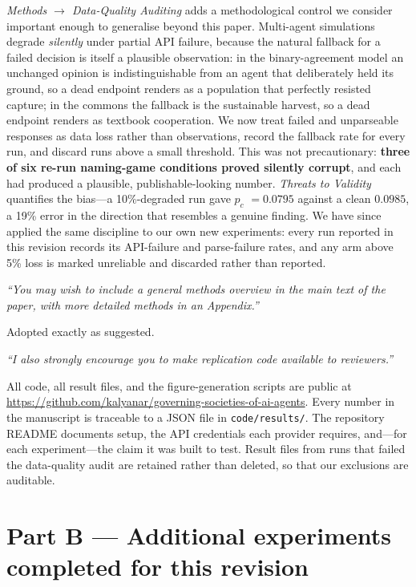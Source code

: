 \documentclass[11pt,a4paper]{article}
\newenvironment{editorquote}
  {\par\medskip\noindent\begin{list}{}{%
     \setlength{\leftmargin}{2em}\setlength{\rightmargin}{1em}}\item[]%
     \color{black!72}\itshape}
  {\end{list}\medskip}
\newcommand{\pc}{$p_c$}
\begin{document}
\emph{Methods $\to$ Data-Quality Auditing} adds a methodological control we consider
important enough to generalise beyond this paper. Multi-agent simulations degrade
\emph{silently} under partial API failure, because the natural fallback for a failed
decision is itself a plausible observation: in the binary-agreement model an
unchanged opinion is indistinguishable from an agent that deliberately held its
ground, so a dead endpoint renders as a population that perfectly resisted capture;
in the commons the fallback is the sustainable harvest, so a dead endpoint renders
as textbook cooperation. We now treat failed and unparseable responses as data loss
rather than observations, record the fallback rate for every run, and discard runs
above a small threshold. This was not precautionary: \textbf{three of six re-run
naming-game conditions proved silently corrupt}, and each had produced a plausible,
publishable-looking number. \emph{Threats to Validity} quantifies the bias---a
10\%-degraded run gave \pc{} $=0.0795$ against a clean $0.0985$, a 19\% error in the
direction that resembles a genuine finding. We have since applied the same
discipline to our own new experiments: every run reported in this revision records
its API-failure and parse-failure rates, and any arm above 5\% loss is marked
unreliable and discarded rather than reported.

\begin{editorquote}
``You may wish to include a general methods overview in the main text of the paper,
with more detailed methods in an Appendix.''
\end{editorquote}

Adopted exactly as suggested.

\begin{editorquote}
``I also strongly encourage you to make replication code available to reviewers.''
\end{editorquote}

All code, all result files, and the figure-generation scripts are public at
\url{https://github.com/kalyanar/governing-societies-of-ai-agents}. Every number in
the manuscript is traceable to a JSON file in \texttt{code/results/}. The repository
README documents setup, the API credentials each provider requires, and---for each
experiment---the claim it was built to test. Result files from runs that failed the
data-quality audit are retained rather than deleted, so that our exclusions are
auditable.

\section*{Part B --- Additional experiments completed for this revision}
\end{document}
